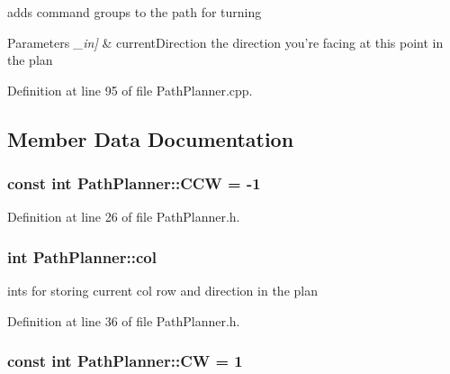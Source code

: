 adds command groups to the path for turning 


\begin{DoxyParams}{Parameters}
{\em \-\_\-in\mbox{]}} & current\-Direction the direction you're facing at this point in the plan \\
\hline
\end{DoxyParams}


Definition at line 95 of file Path\-Planner.\-cpp.



\subsection{Member Data Documentation}
\hypertarget{classPathPlanner_ab08a4cb0f762a4401a804bf0ce1bbbe6}{
\subsubsection[{C\-C\-W}]{\setlength{\rightskip}{0pt plus 5cm}const int Path\-Planner\-::\-C\-C\-W = -\/1\hspace{0.3cm}{\ttfamily [static]}}}\label{classPathPlanner_ab08a4cb0f762a4401a804bf0ce1bbbe6}


Definition at line 26 of file Path\-Planner.\-h.

\hypertarget{classPathPlanner_a20d2bf800c63aacfd1af314ad400d119}{
\subsubsection[{col}]{\setlength{\rightskip}{0pt plus 5cm}int Path\-Planner\-::col\hspace{0.3cm}{\ttfamily [private]}}}\label{classPathPlanner_a20d2bf800c63aacfd1af314ad400d119}


ints for storing current col row and direction in the plan 



Definition at line 36 of file Path\-Planner.\-h.

\hypertarget{classPathPlanner_af08949a4cd572b26f4f37ff441191b3a}{
\subsubsection[{C\-W}]{\setlength{\rightskip}{0pt plus 5cm}const int Path\-Planner\-::\-C\-W = 1\hspace{0.3cm}{\ttfamily [static]}}}\label{classPathPlanner_af08949a4cd572b26f4f37ff441191b3a}


